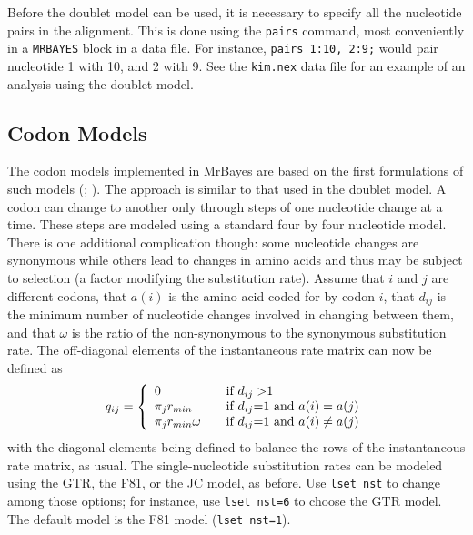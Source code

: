 \documentclass[12pt]{book}
\begin{document}
Before the doublet model can be used, it is necessary to specify all the nucleotide pairs in the
alignment. This is done using the \texttt{pairs} command, most conveniently in a \texttt{MRBAYES}
block in a data file. For instance, \texttt{pairs 1:10, 2:9;} would pair nucleotide 1 with 10, and
2 with 9. See the \texttt{kim.nex} data file for an example of an analysis using the doublet model.

\subsection{Codon Models}

The codon models implemented in MrBayes are based on the first formulations of such models
(\citet{goldman94}; \citet{muse94}). The approach is similar to that used in the doublet model. A
codon can change to another only through steps of one nucleotide change at a time. These steps are
modeled using a standard four by four nucleotide model. There is one additional complication
though: some nucleotide changes are synonymous while others lead to changes in amino acids and thus
may be subject to selection (a factor modifying the substitution rate). Assume that $i$ and $j$ are
different codons, that $a(i)$ is the amino acid coded for by codon $i$, that $d_{ij}$ is the
minimum number of nucleotide changes involved in changing between them, and that $\omega$ is the
ratio of the non-synonymous to the synonymous substitution rate. The off-diagonal elements of the
instantaneous rate matrix can now be defined as
\[
q_{ij} = \left\{
\begin{array}{l l}
  0 & \quad \text{if $d_{ij}>$1 } \\
 \pi_j r_{min} & \quad \text{if $d_{ij}$=1 and $a(i)=a(j)$}\\
 \pi_j r_{min} \omega & \quad \text{if $d_{ij}$=1 and $a(i)\neq a(j)$}\\
\end{array} \right.
\]
with the diagonal elements being defined to balance the rows of the instantaneous rate matrix, as
usual. The single-nucleotide substitution rates can be modeled using the GTR, the F81, or the JC
model, as before. Use \texttt{lset nst} to change among those options; for instance, use
\texttt{lset nst=6} to choose the GTR model. The default model is the F81 model (\texttt{lset
nst=1}).
\end{document}
